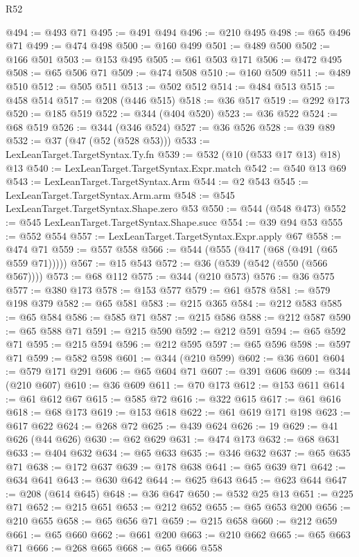 \begin{lexlean}{R52}
\begin{coremodule}
@494 := @493 @71
@495 := @491 @494
@496 := @210 @495
@498 := @65 @496 @71
@499 := @474 @498
@500 := @160 @499
@501 := @489 @500
@502 := @166 @501
@503 := @153 @495
@505 := @61 @503 @171
@506 := @472 @495
@508 := @65 @506 @71
@509 := @474 @508
@510 := @160 @509
@511 := @489 @510
@512 := @505 @511
@513 := @502 @512
@514 := @484 @513
@515 := @458 @514
@517 := @208 (@446 @515)
@518 := @36 @517
@519 := @292 @173
@520 := @185 @519
@522 := @344 (@404 @520)
@523 := @36 @522
@524 := @68 @519
@526 := @344 (@346 @524)
@527 := @36 @526
@528 := @39 @89
@532 := @37 (@47 (@52 (@528 @53)))
@533 := LexLeanTarget.TargetSyntax.Ty.fn
@539 := @532 (@10 (@533 @17 @13) @18) @13
@540 := LexLeanTarget.TargetSyntax.Expr.match
@542 := @540 @13 @69
@543 := LexLeanTarget.TargetSyntax.Arm
@544 := @2 @543
@545 := LexLeanTarget.TargetSyntax.Arm.arm
@548 := @545 LexLeanTarget.TargetSyntax.Shape.zero @53
@550 := @544 (@548 @473)
@552 := @545 LexLeanTarget.TargetSyntax.Shape.succ
@554 := @39 @94 @53
@555 := @552 @554
@557 := LexLeanTarget.TargetSyntax.Expr.apply @67
@558 := @474 @71
@559 := @557 @558
@566 := @544 (@555 (@417 (@68 (@491 (@65 @559 @71)))))
@567 := @15 @543
@572 := @36 (@539 (@542 (@550 (@566 @567))))
@573 := @68 @112
@575 := @344 (@210 @573)
@576 := @36 @575
@577 := @380 @173
@578 := @153 @577
@579 := @61 @578
@581 := @579 @198 @379
@582 := @65 @581
@583 := @215 @365
@584 := @212 @583
@585 := @65 @584
@586 := @585 @71
@587 := @215 @586
@588 := @212 @587
@590 := @65 @588 @71
@591 := @215 @590
@592 := @212 @591
@594 := @65 @592 @71
@595 := @215 @594
@596 := @212 @595
@597 := @65 @596
@598 := @597 @71
@599 := @582 @598
@601 := @344 (@210 @599)
@602 := @36 @601
@604 := @579 @171 @291
@606 := @65 @604 @71
@607 := @391 @606
@609 := @344 (@210 @607)
@610 := @36 @609
@611 := @70 @173
@612 := @153 @611
@614 := @61 @612 @67
@615 := @585 @72
@616 := @322 @615
@617 := @61 @616
@618 := @68 @173
@619 := @153 @618
@622 := @61 @619 @171 @198
@623 := @617 @622
@624 := @268 @72
@625 := @439 @624
@626 := 19
@629 := @41 @626 (@44 @626)
@630 := @62 @629
@631 := @474 @173
@632 := @68 @631
@633 := @404 @632
@634 := @65 @633
@635 := @346 @632
@637 := @65 @635 @71
@638 := @172 @637
@639 := @178 @638
@641 := @65 @639 @71
@642 := @634 @641
@643 := @630 @642
@644 := @625 @643
@645 := @623 @644
@647 := @208 (@614 @645)
@648 := @36 @647
@650 := @532 @25 @13
@651 := @225 @71
@652 := @215 @651
@653 := @212 @652
@655 := @65 @653 @200
@656 := @210 @655
@658 := @65 @656 @71
@659 := @215 @658
@660 := @212 @659
@661 := @65 @660
@662 := @661 @200
@663 := @210 @662
@665 := @65 @663 @71
@666 := @268 @665
@668 := @65 @666 @558

\end{coremodule}
\end{lexlean}
